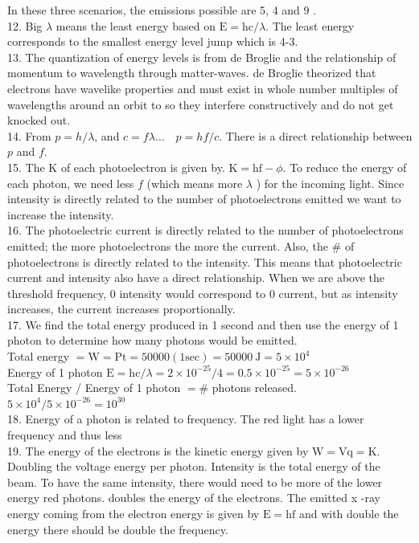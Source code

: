 \begin{enumerate}
In these three scenarios, the emissions possible are 5, 4 and 9 .\\
12. Big $\lambda$ means the least energy based on $\mathrm{E}=\mathrm{hc} / \lambda$. The least energy corresponds to the smallest energy level jump which is 4-3.\\
13. The quantization of energy levels is from de Broglie and the relationship of momentum to wavelength through matter-waves. de Broglie theorized that electrons have wavelike properties and must exist in whole number multiples of wavelengths around an orbit to so they interfere constructively and do not get knocked out.\\
14. From $p=h / \lambda$, and $c=f \lambda \ldots \quad p=h f / c$. There is a direct relationship between $p$ and $f$.\\
15. The K of each photoelectron is given by. $\mathrm{K}=\mathrm{hf}-\phi$. To reduce the energy of each photon, we need less $f$ (which means more $\lambda$ ) for the incoming light. Since intensity is directly related to the number of photoelectrons emitted we want to increase the intensity.\\
16. The photoelectric current is directly related to the number of photoelectrons emitted; the more photoelectrons the more the current. Also, the \# of photoelectrons is directly related to the intensity. This means that photoelectric current and intensity also have a direct relationship. When we are above the threshold frequency, 0 intensity would correspond to 0 current, but as intensity increases, the current increases proportionally.\\
17. We find the total energy produced in 1 second and then use the energy of 1 photon to determine how many photons would be emitted.\\
Total energy $=\mathrm{W}=\mathrm{Pt}=50000(1 \mathrm{sec})=50000 \mathrm{~J}=5 \times 10^{4}$\\
Energy of 1 photon $\mathrm{E}=\mathrm{hc} / \lambda=2 \times 10^{-25} / 4=0.5 \times 10^{-25}=5 \times 10^{-26}$\\
Total Energy / Energy of 1 photon $=\#$ photons released.\\
$5 \times 10^{4} / 5 \times 10^{-26}=10^{30}$\\
18. Energy of a photon is related to frequency. The red light has a lower frequency and thus less\\
19. The energy of the electrons is the kinetic energy given by $\mathrm{W}=\mathrm{Vq}=\mathrm{K}$. Doubling the voltage energy per photon. Intensity is the total energy of the beam. To have the same intensity, there would need to be more of the lower energy red photons. doubles the energy of the electrons. The emitted x -ray energy coming from the electron energy is given by $\mathrm{E}=\mathrm{hf}$ and with double the energy there should be double the frequency.


\end{enumerate}
